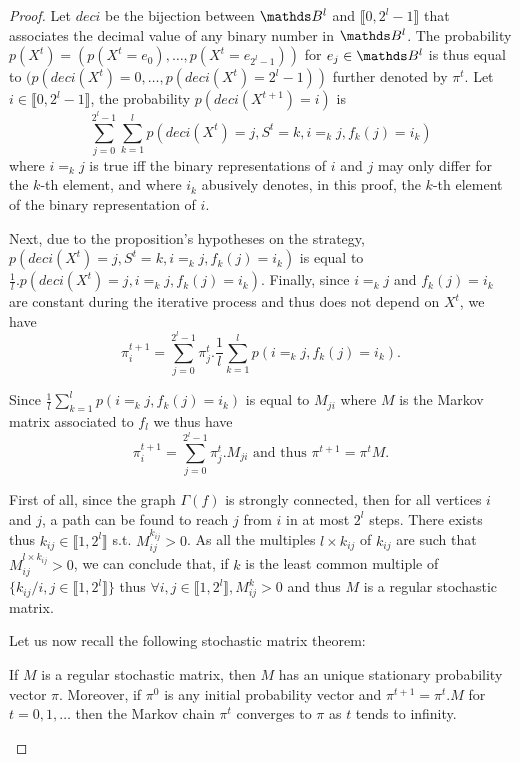 \documentclass{comjnl}
\begin{document}
\begin{proof}   
Let $\textit{deci}$ be the bijection between $\Bool^{l}$ and 
$\llbracket 0, 2^l-1 \rrbracket$ that associates the decimal value
of any  binary number in $\Bool^{l}$.
The probability $p(X^t) = (p(X^t= e_0),\dots,p(X^t= e_{2^l-1}))$ for $e_j \in \Bool^{l}$ is thus equal to 
$(p(\textit{deci}(X^t)= 0,\dots,p(\textit{deci}(X^t)= 2^l-1))$ further denoted by $\pi^t$.
Let $i \in \llbracket 0, 2^l -1 \rrbracket$, 
the probability $p(\textit{deci}(X^{t+1})= i)$  is 
\[
 \sum\limits^{2^l-1}_{j=0}  
\sum\limits^{l}_{k=1} 
p(\textit{deci}(X^{t}) = j , S^t = k , i =_k j , f_k(j) = i_k ) 
\]
\noindent 
where $ i =_k j $ is true iff the binary representations of 
$i$ and $j$ may only differ for the  $k$-th element,
and where 
$i_k$ abusively denotes, in this proof, the $k$-th element of the binary representation of 
$i$.

Next, due to the proposition's hypotheses on the strategy,
$p(\textit{deci}(X^t) = j , S^t = k , i =_k j, f_k(j) = i_k )$ is equal to  
$\frac{1}{l}.p(\textit{deci}(X^t) = j ,  i =_k j, f_k(j) = i_k)$.
Finally, since $i =_k j$ and $f_k(j) = i_k$ are constant during the 
iterative process  and thus does not depend on $X^t$, we have 
\[
\pi^{t+1}_i = \sum\limits^{2^l-1}_{j=0}
\pi^t_j.\frac{1}{l}  
\sum\limits^{l}_{k=1} 
p(i =_k j, f_k(j) = i_k ).
\]

Since 
$\frac{1}{l}  
\sum\limits^{l}_{k=1} 
p(i =_k j, f_k(j) = i_k ) 
$ is equal to $M_{ji}$ where  $M$ is the Markov matrix associated to
 $f_l$ we thus have
\[
\pi^{t+1}_i = \sum\limits^{2^l-1}_{j=0}
\pi^t_j. M_{ji} \textrm{ and thus }
\pi^{t+1} = \pi^{t} M.
\]


First of all, 
since the graph $\Gamma(f)$ is strongly connected,
then for all vertices $i$ and $j$, a path can
be  found to  reach $j$  from $i$  in at  most $2^l$  steps.  
There  exists thus $k_{ij} \in \llbracket 1,  2^l \rrbracket$ s.t.
${M}_{ij}^{k_{ij}}>0$.  
As all the multiples $l \times k_{ij}$ of $k_{ij}$ are such that 
${M}_{ij}^{l\times  k_{ij}}>0$, 
we can  conclude that, if
$k$ is the least common multiple of $\{k_{ij}  \big/ i,j  \in \llbracket 1,  2^l \rrbracket  \}$ thus 
$\forall i,j  \in \llbracket  1, 2^l \rrbracket,  {M}_{ij}^{k}>0$ and thus 
$M$ is a regular stochastic matrix.


Let us now recall the following stochastic matrix theorem:
\begin{theorem}
  If $M$ is a regular stochastic matrix, then $M$ 
  has an unique stationary  probability vector $\pi$. Moreover, 
  if $\pi^0$ is any initial probability vector and 
  $\pi^{t+1} = \pi^t.M $ for $t = 0, 1,\dots$ then the Markov chain $\pi^t$
  converges to $\pi$ as $t$ tends to infinity.
\end{theorem}


\end{proof}
\end{document}
